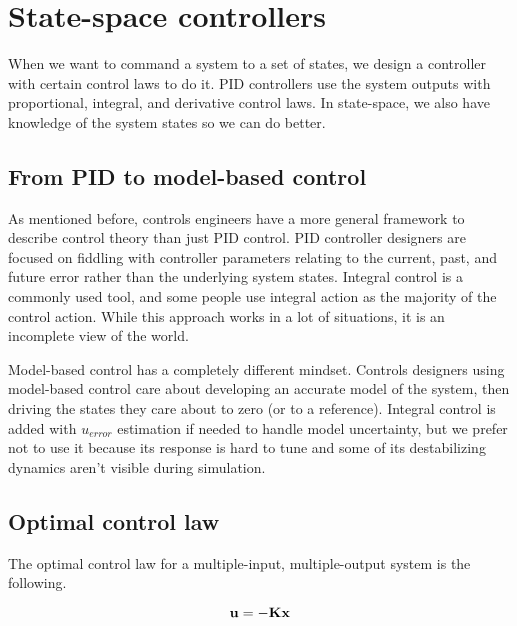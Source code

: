 
\chapter{State-space controllers}

When we want to command a \gls{system} to a set of states, we design a
controller with certain \glspl{control law} to do it. PID controllers use the
system outputs with proportional, integral, and derivative \glspl{control law}.
In state-space, we also have knowledge of the system states so we can do better.

\section{From PID to model-based control}

As mentioned before, controls engineers have a more general framework to
describe control theory than just PID control. PID controller designers are
focused on fiddling with controller parameters relating to the current, past,
and future error rather than the underlying system states. Integral control is a
commonly used tool, and some people use integral action as the majority of the
control action. While this approach works in a lot of situations, it is an
incomplete view of the world.

Model-based control has a completely different mindset. Controls designers using
model-based control care about developing an accurate model of the system, then
driving the states they care about to zero (or to a \gls{reference}). Integral
control is added with $u_{error}$ estimation if needed to handle model
uncertainty, but we prefer not to use it because its response is hard to tune
and some of its destabilizing dynamics aren't visible during simulation.

\section{Optimal control law}

The optimal \gls{control law} for a multiple-input, multiple-output system is
the following.

\begin{theorem}
  \begin{equation}
    \mathbf{u} = -\mathbf{K}\mathbf{x}
  \end{equation}
\end{theorem}

